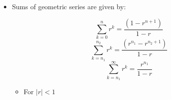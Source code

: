 \begin{itemize}
\begin{itemize}
      \item Sums of geometric series are given by:

        $$\sum_{k=0}^{n}r^k=\frac{(1-r^{n+1})}{1-r}$$
        $$\sum_{k=n_1}^{n_2}r^k=\frac{(r^{n_1}-r^{n_2+1})}{1-r}$$
        $$\sum_{k=n_1}^{\infty}r^k=\frac{r^{n_1}}{1-r}$$

        \begin{itemize}

          \item For $|r|<1$

        \end{itemize}

    \end{itemize}

\end{itemize}



